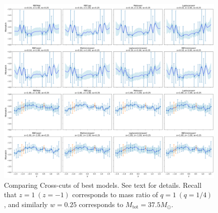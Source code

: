 \documentclass[10pt]{article}
\begin{document}
\begin{figure}[H]
    \centering
    \includegraphics[width=1\textwidth]{LatexPlots/final_gps_plots/gps_crosscuts_bestmodels.png}
    \caption{Comparing Cross-cuts of best models. See text for details. Recall that $z=1\ (z=-1)$ corresponds
    to mass ratio of $q=1\ (q=1/4)$, and similarly $w=0.25$ corresponds to $M_\text{tot}=37.5M_\odot$.}
    \label{fig:crosscuts_bestmodels}
\end{figure}
\end{document}
